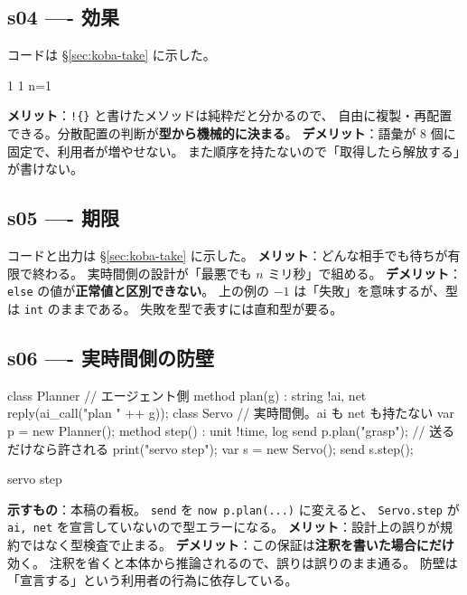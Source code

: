 \documentclass[11pt,a4paper]{ltjsarticle}
\theoremstyle{definition}
\theoremstyle{remark}
\begin{document}
\subsection{s04 ---- 効果}
コードは \S\ref{sec:koba-take} に示した。
\begin{term}
1
1
n=1
\end{term}
\textbf{メリット}：\texttt{!\{\}} と書けたメソッドは純粋だと分かるので、
自由に複製・再配置できる。分散配置の判断が\textbf{型から機械的に決まる}。
\textbf{デメリット}：語彙が 8 個に固定で、利用者が増やせない。
また順序を持たないので「取得したら解放する」が書けない。

\subsection{s05 ---- 期限}
コードと出力は \S\ref{sec:koba-take} に示した。
\textbf{メリット}：どんな相手でも待ちが有限で終わる。
実時間側の設計が「最悪でも $n$ ミリ秒」で組める。
\textbf{デメリット}：\texttt{else} の値が\textbf{正常値と区別できない}。
上の例の $-1$ は「失敗」を意味するが、型は \texttt{int} のままである。
失敗を型で表すには直和型が要る。

\subsection{s06 ---- 実時間側の防壁}
\begin{aipl}
class Planner {                       // エージェント側
  method plan(g) : string !{ai, net} { reply(ai_call("plan " ++ g)); }
}
class Servo {                         // 実時間側。ai も net も持たない
  var p = new Planner();
  method step() : unit !{time, log} {
    send p.plan("grasp");             // 送るだけなら許される
    print("servo step");
  }
}
var s = new Servo();
send s.step();
\end{aipl}
\begin{term}
servo step
\end{term}
\textbf{示すもの}：本稿の看板。
\texttt{send} を \texttt{now p.plan(...)} に変えると、
\texttt{Servo.step} が \texttt{ai, net} を宣言していないので型エラーになる。
\textbf{メリット}：設計上の誤りが規約ではなく型検査で止まる。
\textbf{デメリット}：この保証は\textbf{注釈を書いた場合にだけ}効く。
注釈を省くと本体から推論されるので、誤りは誤りのまま通る。
防壁は「宣言する」という利用者の行為に依存している。
\end{document}
